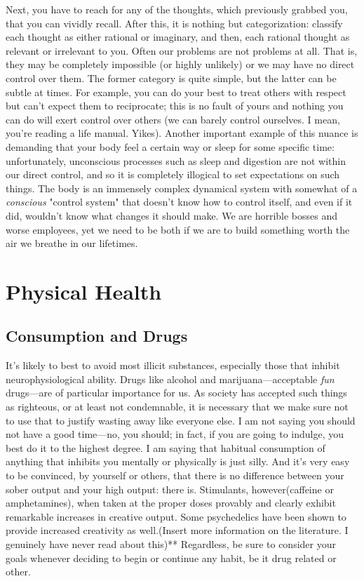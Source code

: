 \documentclass{book}
\numberwithin{equation}{section}
\begin{document}
Next, you have to reach for any of the thoughts, which previously grabbed you, that you can vividly recall. After this, it is nothing but categorization: classify each thought as either rational or imaginary, and then, each rational thought as relevant or irrelevant to you. Often our problems are not problems at all. That is, they may be completely impossible (or highly unlikely) or we may have no direct control over them. The former category is quite simple, but the latter can be subtle at times. For example, you can do your best to treat others with respect but can't expect them to reciprocate; this is no fault of yours and nothing you can do will exert control over others (we can barely control ourselves. I mean, you're reading a life manual. Yikes).
Another important example of this nuance is demanding that your body feel a certain way or sleep for some specific time: unfortunately, unconscious processes such as sleep and digestion are not within our direct control, and so it is completely illogical to set expectations on such things. The body is an immensely complex dynamical system with somewhat of a \emph{conscious} "control system" that doesn't know how to control itself, and even if it did, wouldn't know what changes it should make. We are horrible bosses and worse employees, yet we need to be both if we are to build something worth the air we breathe in our lifetimes.
\section{Physical Health}
\subsection{Consumption and Drugs}
It's likely to best to avoid most illicit substances, especially those that inhibit neurophysiological ability. Drugs like alcohol and marijuana---acceptable \emph{fun} drugs---are of particular importance for us. As society has accepted such things as righteous, or at least not condemnable, it is necessary that we make sure not to use that to justify wasting away like everyone else. I am not saying you should not have a good time---no, you should; in fact, if you are going to indulge, you best do it to the highest degree. I am saying that habitual consumption of anything that inhibits you mentally or physically is just silly. And it's very easy to be convinced, by yourself or others, that there is no difference between your sober output and your high output: there is.
Stimulants, however(caffeine or amphetamines), when taken at the proper doses provably and clearly exhibit remarkable increases in creative output. Some psychedelics have been shown to provide increased creativity as well.(Insert more information on the literature. I genuinely have never read about this)** 
Regardless, be sure to consider your goals whenever deciding to begin or continue any habit, be it drug related or other. 
\end{document}
